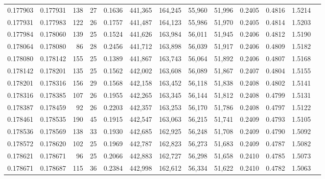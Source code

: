 \begin{tabular}{rrrrrrrrrrrrr}
0.177903 & 0.177931 & 138 &  27 &                                     0.1636 & 441,365 & 164,245 &  55,960 &  51,996 & 0.2405 & 0.4816 & 1.5214 \\
0.177931 & 0.177983 & 122 &  26 &                                     0.1757 & 441,487 & 164,123 &  55,986 &  51,970 & 0.2405 & 0.4814 & 1.5203 \\
0.177984 & 0.178060 & 139 &  25 &                                     0.1524 & 441,626 & 163,984 &  56,011 &  51,945 & 0.2406 & 0.4812 & 1.5190 \\
0.178064 & 0.178080 &  86 &  28 &                                     0.2456 & 441,712 & 163,898 &  56,039 &  51,917 & 0.2406 & 0.4809 & 1.5182 \\
0.178080 & 0.178142 & 155 &  25 &                                     0.1389 & 441,867 & 163,743 &  56,064 &  51,892 & 0.2406 & 0.4807 & 1.5168 \\
0.178142 & 0.178201 & 135 &  25 &                                     0.1562 & 442,002 & 163,608 &  56,089 &  51,867 & 0.2407 & 0.4804 & 1.5155 \\
0.178201 & 0.178316 & 156 &  29 &                                     0.1568 & 442,158 & 163,452 &  56,118 &  51,838 & 0.2408 & 0.4802 & 1.5141 \\
0.178316 & 0.178385 & 107 &  26 &                                     0.1955 & 442,265 & 163,345 &  56,144 &  51,812 & 0.2408 & 0.4799 & 1.5131 \\
0.178387 & 0.178459 &  92 &  26 &                                     0.2203 & 442,357 & 163,253 &  56,170 &  51,786 & 0.2408 & 0.4797 & 1.5122 \\
0.178461 & 0.178535 & 190 &  45 &                                     0.1915 & 442,547 & 163,063 &  56,215 &  51,741 & 0.2409 & 0.4793 & 1.5105 \\
0.178536 & 0.178569 & 138 &  33 &                                     0.1930 & 442,685 & 162,925 &  56,248 &  51,708 & 0.2409 & 0.4790 & 1.5092 \\
0.178572 & 0.178620 & 102 &  25 &                                     0.1969 & 442,787 & 162,823 &  56,273 &  51,683 & 0.2409 & 0.4787 & 1.5082 \\
0.178621 & 0.178671 &  96 &  25 &                                     0.2066 & 442,883 & 162,727 &  56,298 &  51,658 & 0.2410 & 0.4785 & 1.5073 \\
0.178671 & 0.178687 & 115 &  36 &                                     0.2384 & 442,998 & 162,612 &  56,334 &  51,622 & 0.2410 & 0.4782 & 1.5063 \\

\end{tabular}

